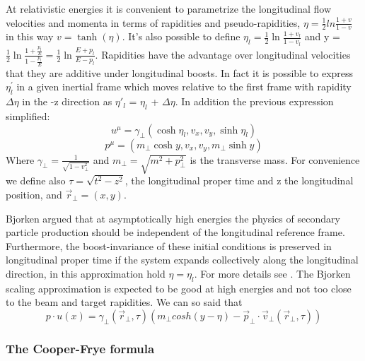 \documentclass[12pt,a4paper]{book}
\begin{document}
	At relativistic energies it is convenient to parametrize the longitudinal flow velocities and momenta in terms of rapidities and pseudo-rapidities, $\eta= \frac{1}{2} ln \frac{1+v}{1-v}$ in this way $v = \tanh (\eta)$. It's also possible to define $\eta_l = \frac{1}{2} \ln \frac{1+v_l}{1-v_l}$ and y = $\frac{1}{2} \ln \frac{1+\frac{p_l}{E}}{1-\frac{p_l}{E}}= \frac{1}{2} \ln \frac{E+p_l}{E -p _l}$.  Rapidities have the advantage over longitudinal velocities that they are additive under longitudinal boosts. In fact it is possible to express $\eta_l^{'}$ in a given inertial frame which moves relative to the first frame with rapidity $\Delta \eta$ in the -z direction as $\eta'_l$ = $\eta_l$ + $\Delta \eta$. In addition the previous expression simplified:
	\begin{equation}
		u^\mu=\gamma_\perp(\cosh \eta_l,v_x,v_y,\sinh \eta_l)
		\label{eq:4_velocity}
	\end{equation}
	\begin{equation}
		p^\mu=(m_\perp \cosh y,v_x,v_y, m_\perp \sinh y)
		\label{eq:4_momentum}
	\end{equation}
	Where $\gamma_\perp = \frac{1}{\sqrt{1-v_\perp^2}}$ and $m_\perp=\sqrt{m^2 + p_\perp^2}$ is the transverse mass. For convenience we define also $\tau=\sqrt{t^2-z^2}$, the longitudinal proper time and z the longitudinal position, and $\vec{r}_\perp=(x,y)$.
	
	Bjorken argued that at asymptotically high energies the physics of secondary particle production should be independent of the longitudinal reference frame. Furthermore, the boost-invariance of these initial conditions is preserved in longitudinal proper time if the system expands collectively along the longitudinal direction, in this approximation hold $\eta=\eta_l$. For more details see \cite{PhysRevD.27.140}. The Bjorken scaling approximation is expected to be good at high energies and not too close to the beam and target rapidities. We can so said that
	\begin{equation}
		p \cdot u(x) = \gamma_\perp(\vec{r}_\perp, \tau) \left(m_\perp cosh(y-\eta) - \vec{p}_\perp \cdot \vec{v}_\perp(\vec{r}_\perp, \tau) \right)
		\label{eq:p*u}
	\end{equation}
	
	\subsubsection{The Cooper-Frye formula}
	
\end{document}
